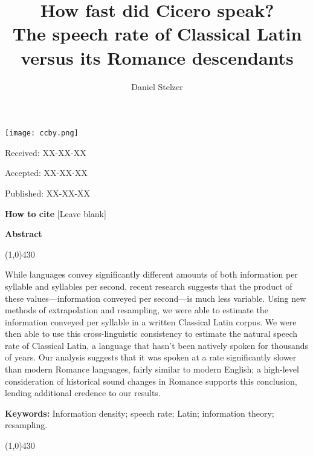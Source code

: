 \documentclass[12pt,twoside]{article}
\title{{\Huge{}How fast did Cicero speak?}\\{\Large{}The speech rate of Classical Latin versus its Romance descendants}}
\author{Daniel Stelzer}
\affil{University of Illinois at Urbana-Champaign\\stelzer3@illinois.edu}
\date{}
\makeatletter
\def\maketitle{{%
		\renewenvironment{tabular}[2][]
		{\begin{flushleft}}
			{\end{flushleft}}
		\AB@maketitle}}
\makeatother
\begin{document}
\maketitle

\thispagestyle{first}

\vspace{0.5cm}
\noindent \texttt{[image: ccby.png]}

\hfill Received: XX-XX-XX

\hfill Accepted: XX-XX-XX

\hfill Published: XX-XX-XX

\vspace{1cm}

\noindent \textbf{How to cite} [Leave blank]

\vspace{1.5cm}

\noindent \textbf{Abstract}
\begin{center}
 	\line(1,0){430}
\end{center}
\vspace{-0,3cm}
\noindent While languages convey significantly different amounts of both information per syllable and syllables per second, recent research suggests that the product of these values---information conveyed per second---is much less variable. Using new methods of extrapolation and resampling, we were able to estimate the information conveyed per syllable in a written Classical Latin corpus. We were then able to use this cross-linguistic consistency to estimate the natural speech rate of Classical Latin, a language that hasn't been natively spoken for thousands of years. Our analysis suggests that it was spoken at a rate significantly slower than modern Romance languages, fairly similar to modern English; a high-level consideration of historical sound changes in Romance supports this conclusion, lending additional credence to our results.

\vspace{5mm}

\noindent \textbf{Keywords:} Information density; speech rate; Latin; information theory; resampling.

\vspace{4mm}
\begin{center}
	\line(1,0){430}
\end{center}

\end{document}
